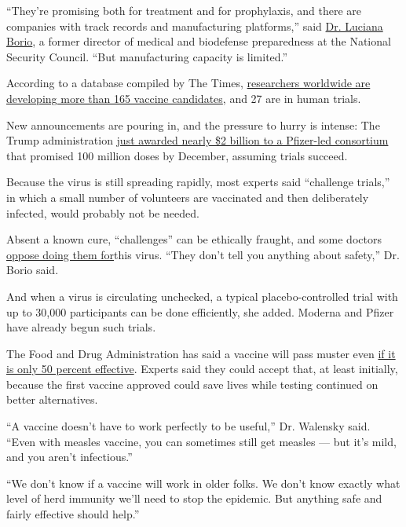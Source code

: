 ``They're promising both for treatment and for prophylaxis, and there
are companies with track records and manufacturing platforms,'' said
\href{http://leighbureau.com/speakers/lborio}{Dr. Luciana Borio}, a
former director of medical and biodefense preparedness at the National
Security Council. ``But manufacturing capacity is limited.''

According to a database compiled by The Times,
\href{https://www.nytimes3xbfgragh.onion/interactive/2020/science/coronavirus-vaccine-tracker.html}{researchers
worldwide are developing more than 165 vaccine candidates}, and 27 are
in human trials.

New announcements are pouring in, and the pressure to hurry is intense:
The Trump administration
\href{https://www.nytimes3xbfgragh.onion/2020/07/22/us/politics/pfizer-coronavirus-vaccine.html}{just
awarded nearly \$2 billion to a Pfizer-led consortium} that promised 100
million doses by December, assuming trials succeed.

Because the virus is still spreading rapidly, most experts said
``challenge trials,'' in which a small number of volunteers are
vaccinated and then deliberately infected, would probably not be needed.

Absent a known cure, ``challenges'' can be ethically fraught, and some
doctors
\href{https://www.statnews.com/2020/06/23/challenge-trials-live-coronavirus-speedy-covid-19-vaccine/}{oppose
doing them for}this virus. ``They don't tell you anything about
safety,'' Dr. Borio said.

And when a virus is circulating unchecked, a typical placebo-controlled
trial with up to 30,000 participants can be done efficiently, she added.
Moderna and Pfizer have already begun such trials.

The Food and Drug Administration has said a vaccine will pass muster
even
\href{https://www.washingtonpost.com/health/2020/06/30/coronavirus-vaccine-approval-fda/}{if
it is only 50 percent effective}. Experts said they could accept that,
at least initially, because the first vaccine approved could save lives
while testing continued on better alternatives.

``A vaccine doesn't have to work perfectly to be useful,'' Dr. Walensky
said. ``Even with measles vaccine, you can sometimes still get measles
--- but it's mild, and you aren't infectious.''

``We don't know if a vaccine will work in older folks. We don't know
exactly what level of herd immunity we'll need to stop the epidemic. But
anything safe and fairly effective should help.''

